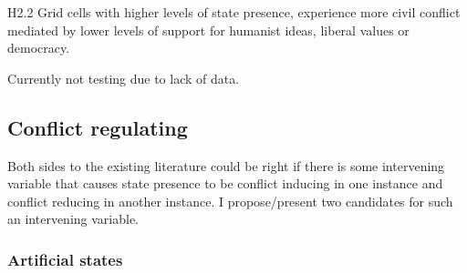 \documentclass[12pt]{article}
\begin{document}
\begin{multicols}{2}
H2.2 Grid cells with higher levels of state presence, experience more civil
conflict mediated by lower levels of support for humanist ideas, liberal
values or democracy.

Currently not testing due to lack of data.

\subsection{Conflict regulating}

Both sides to the existing literature could be right if there is some
intervening variable that causes state presence to be conflict inducing in one
instance and conflict reducing in another instance. I propose/present two
candidates for such an intervening variable.

\subsubsection{Artificial states}


\end{multicols}
\end{document}
